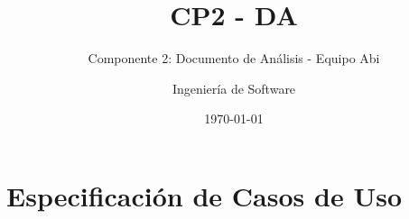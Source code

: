 \documentclass[10pt]{book}
\title{CP2 - DA}
\subtitle{Componente 2: Documento de Análisis - Equipo Abi}
\author{Ingeniería de Software}
\date{\today}
\begin{document}
\maketitle
\thispagestyle{empty}
\tableofcontents

%
%

\chapter{Especificación de Casos de Uso}


%

\end{document}
